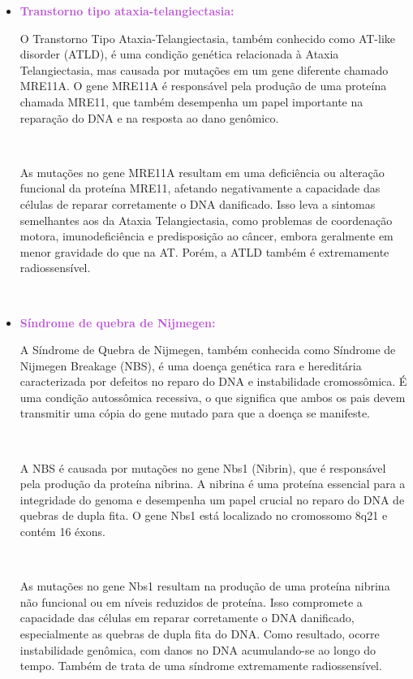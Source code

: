 \documentclass[11pt,a4paper]{article}
\begin{document}
\begin{itemize}[label=\textcolor{CarnationPink}{$\blacktriangleright$}]
\begin{itemize}[label=\textcolor{CarnationPink}{$\star$}]
			\

			\item \textcolor{MediumOrchid}{\large\textbf{Transtorno tipo ataxia-telangiectasia:}}
			
			O Transtorno Tipo Ataxia-Telangiectasia, também conhecido como AT-like disorder (ATLD), é uma condição genética relacionada à Ataxia Telangiectasia, mas causada por mutações em um gene diferente chamado MRE11A. O gene MRE11A é responsável pela produção de uma proteína chamada MRE11, que também desempenha um papel importante na reparação do DNA e na resposta ao dano genômico.

			\

			As mutações no gene MRE11A resultam em uma deficiência ou alteração funcional da proteína MRE11, afetando negativamente a capacidade das células de reparar corretamente o DNA danificado. Isso leva a sintomas semelhantes aos da Ataxia Telangiectasia, como problemas de coordenação motora, imunodeficiência e predisposição ao câncer, embora geralmente em menor gravidade do que na AT. Porém, a ATLD também é extremamente radiossensível.

			\

			\item \textcolor{MediumOrchid}{\large\textbf{Síndrome de quebra de Nijmegen:}}
			
			A Síndrome de Quebra de Nijmegen, também conhecida como Síndrome de Nijmegen Breakage (NBS), é uma doença genética rara e hereditária caracterizada por defeitos no reparo do DNA e instabilidade cromossômica. É uma condição autossômica recessiva, o que significa que ambos os pais devem transmitir uma cópia do gene mutado para que a doença se manifeste. 

			\

			A NBS é causada por mutações no gene Nbs1 (Nibrin), que é responsável pela produção da proteína nibrina. A nibrina é uma proteína essencial para a integridade do genoma e desempenha um papel crucial no reparo do DNA de quebras de dupla fita. O gene Nbs1 está localizado no cromossomo 8q21 e contém 16 éxons.

			\

			As mutações no gene Nbs1 resultam na produção de uma proteína nibrina não funcional ou em níveis reduzidos de proteína. Isso compromete a capacidade das células em reparar corretamente o DNA danificado, especialmente as quebras de dupla fita do DNA. Como resultado, ocorre instabilidade genômica, com danos no DNA acumulando-se ao longo do tempo. Também de trata de uma síndrome extremamente radiossensível.


\end{itemize}
\end{itemize}
\end{document}
